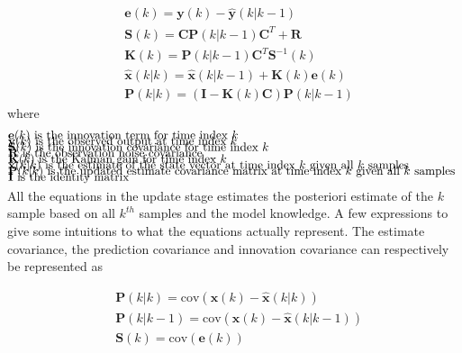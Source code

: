\begin{align}
	&\textbf{e}			(k) 		= \textbf{y}(k) - \hat{\textbf{y}}(k|k-1)							\label{eq:Kalman_upd_inno}			\\
	&\textbf{S}			(k) 		= \textbf{C}\textbf{P}(k|k-1)\textbf{C}^T + \textbf{R}				\label{eq:Kalman_upd_inno_cov}		\\
	&\textbf{K}			(k) 		= \textbf{P}(k|k-1)\textbf{C}^T\textbf{S}^{-1}(k)					\label{eq:Kalman_upd_kalman_gain}	\\
	&\hat{\textbf{x}}	(k|k) 		= \hat{\textbf{x}}(k|k-1) + \textbf{K}(k)\textbf{e}(k) 				\label{eq:Kalman_upd_est_state}		\\
	&\textbf{P}			(k|k) 		= (\textbf{I} - \textbf{K}(k)\textbf{C})\textbf{P}(k|k-1)			\label{eq:Kalman_upd_est_cov}
\end{align}
where 
\begin{align*}
	&\text{$\textbf{e}		(k)$ 		is the innovation term for time index 					$ k $													}	\\[-1em]
	&\text{$\textbf{y}		(k)$ 		is the observed output at time index 					$ k $													}	\\[-1em]
	&\text{$\textbf{S}		(k)$ 		is the innovation covariance for time index 			$ k $											}	\\[-1em]
	&\text{$\textbf{R}$ 				is the observation noise covariance																}	\\[-1em]
	&\text{$\textbf{K}		(k)$ 		is the Kalman gain for time index 						$ k $													}	\\[-1em]
	&\text{$\hat{\textbf{x}}(k|k)$ 	is the estimate of the state vector at time index 			$ k $ given all 	$ k$ samples	}	\\[-1em]
	&\text{$\textbf{P}		(k|k)$ 	is the updated estimate covariance matrix at time index 	$ k $ given all 	$ k$ samples		}	\\[-1em]
	&\text{$\textbf{I}$ 				is the identity matrix																				}	\\[-1em]			
\end{align*}

All the equations in the update stage estimates the posteriori estimate of the $ k $ sample based on all $ k^{th} $ samples and the model knowledge. A few expressions to give some intuitions to what the equations actually represent. The estimate covariance, the prediction covariance and innovation covariance can respectively be represented as 

\begin{align}
	&\textbf{P}(k|k) 	= \text{cov}(\textbf{x}(k)-	\hat{\textbf{x}}(k|k))	\\
	&\textbf{P}(k|k-1) 	= \text{cov}(\textbf{x}(k)-	\hat{\textbf{x}}(k|k-1)) 		\\
	&\textbf{S}(k) 		= \text{cov}(\textbf{e}(k)) 
\end{align}

